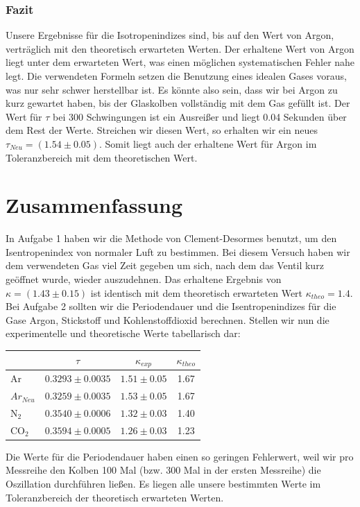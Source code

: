 \documentclass{article}
\begin{document}
{{\subsubsection{Fazit}
Unsere Ergebnisse für die Isotropenindizes sind, bis auf den Wert von Argon, verträglich mit den theoretisch erwarteten Werten. Der erhaltene Wert von Argon liegt unter dem erwarteten Wert, was einen möglichen systematischen Fehler nahe legt. Die verwendeten Formeln setzen die Benutzung eines idealen Gases voraus, was nur sehr schwer herstellbar ist. Es könnte also sein, dass wir bei Argon zu kurz gewartet haben, bis der Glaskolben vollständig mit dem Gas gefüllt ist. Der Wert für \(\tau\) bei 300 Schwingungen ist ein Ausreißer und liegt 0.04 Sekunden über dem Rest der Werte. Streichen wir diesen Wert, so erhalten wir ein neues \(\tau_{Neu} = (1.54\pm 0.05)\). Somit liegt auch der erhaltene Wert für Argon im Toleranzbereich mit dem theoretischen Wert.
\newpage
\section{Zusammenfassung}
In Aufgabe 1 haben wir die Methode von Clement-Desormes benutzt, um den Isentropenindex von normaler Luft zu bestimmen. Bei diesem Versuch haben wir dem verwendeten Gas viel Zeit gegeben um sich, nach dem das Ventil kurz geöffnet wurde, wieder auszudehnen. Das erhaltene Ergebnis von \(\kappa = (1.43 \pm 0.15) \) ist identisch mit dem theoretisch erwarteten Wert \(\kappa_{theo}=1.4\).\\
Bei Aufgabe 2 sollten wir die Periodendauer und die Isentropenindizes für die Gase Argon, Stickstoff und Kohlenstoffdioxid berechnen. Stellen wir nun die experimentelle und theoretische Werte tabellarisch dar:

\begin{center}
\begin{tabular}{l|c|c|c}
& \(\tau\) & \(\kappa_{exp}\) & \(\kappa_{theo}\)\\
\hline
Ar &  \(0.3293\pm 0.0035\) & \(1.51\pm 0.05\) & 1.67\\
\(Ar_{Neu}\) &  \(0.3259\pm 0.0035\) & \(1.53\pm 0.05\) & 1.67\\
N\(_2\) & \(0.3540\pm 0.0006\) & \(1.32\pm 0.03\) & 1.40\\
CO\(_2\) & \(0.3594\pm 0.0005\)  & \(1.26\pm 0.03\) & 1.23\\
\end{tabular}
\end{center}
\vspace{1cm}
Die Werte für die Periodendauer haben einen so geringen Fehlerwert, weil wir pro Messreihe den Kolben 100 Mal (bzw. 300 Mal in der ersten Messreihe) die Oszillation durchführen ließen. Es liegen alle unsere bestimmten Werte im Toleranzbereich der theoretisch erwarteten Werten. 

}}
\end{document}

